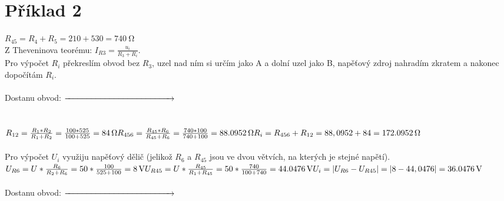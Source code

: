 \section{Příklad 2}

\vspace*{1cm}

\begin{multicols}{2}
\let\clearpage\relax

\noindent $R_{45} = R_4+R_5 = 210+530 = \SI{740}{\ohm}$ \\
\noindent Z Theveninova teorému: $I_{R3} = \frac{u_i}{R_3+R_i}$. \\
Pro výpočet $R_i$ překreslím obvod bez $R_3$, uzel nad ním si určím jako A a dolní uzel jako B, napěťový zdroj nahradím zkratem a nakonec dopočítám $R_i$. \\ \\
Dostanu obvod: \hspace*{0.5cm} \vspace*{-0.82cm} $\xrightarrow{\hspace*{4.5cm}}$ \\
\vspace*{0.4cm} \\ \\
\noindent $R_{12} = \frac{R_1*R_2}{R_1+R_2} = \frac{100*525}{100+525} = \SI{84}{\ohm} \\
R_{456} = \frac{R_{45}*R_6}{R_{45}+R_6} = \frac{740*100}{740+100} = \SI{88,0952}{\ohm} \\
R_i = R_{456}+R_{12} = 88,0952+84 = \SI{172,0952}{\ohm}$ \\ \\
\noindent Pro výpočet $U_i$ využiju napěťový dělič (jelikož $R_6$ a $R_{45}$ jsou ve dvou větvích, na kterých je stejné napětí). \\
$U_{R6} = U*\frac{R_6}{R_2+R_6} = 50*\frac{100}{525+100} = \SI{8}{\volt} \\
U_{R45} = U*\frac{R_{45}}{R_1+R_{45}} = 50*\frac{740}{100+740} = \SI{44,0476}{\volt} \\
U_i = \lvert U_{R6}-U_{R45} \rvert = \lvert 8-44,0476 \rvert = \SI{36,0476}{\volt}$ \\ \\
Dostanu obvod: \hspace*{0.5cm} \vspace*{-0.82cm} $\xrightarrow{\hspace*{4.5cm}}$ \\
\vspace*{0.4cm} \\ \\





\end{multicols}
